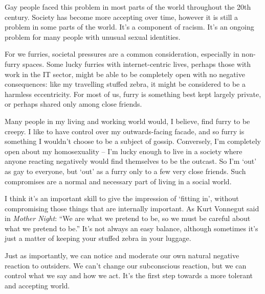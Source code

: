 Gay people faced this problem in most parts of the world throughout the 20th century. Society has become more accepting over time, however it is still a problem in some parts of the world. It's a component of racism. It's an ongoing problem for many people with unusual sexual identities.

For we furries, societal pressures are a common consideration, especially in non-furry spaces. Some lucky furries with internet-centric lives, perhaps those with work in the IT sector, might be able to be completely open with no negative consequences: like my travelling stuffed zebra, it might be considered to be a harmless eccentricity. For most of us, furry is something best kept largely private, or perhaps shared only among close friends.

Many people in my living and working world would, I believe, find furry to be creepy. I like to have control over my outwards-facing facade, and so furry is something I wouldn't choose to be a subject of gossip. Conversely, I'm completely open about my homosexuality -- I'm lucky enough to live in a society where anyone reacting negatively would find themselves to be the outcast. So I'm `out' as gay to everyone, but `out' as a furry only to a few very close friends. Such compromises are a normal and necessary part of living in a social world.

I think it's an important skill to give the impression of `fitting in', without compromising those things that are internally important. As Kurt Vonnegut said in \textit{Mother Night}: ``We are what we pretend to be, so we must be careful about what we pretend to be.'' It's not always an easy balance, although sometimes it's just a matter of keeping your stuffed zebra in your luggage.

Just as importantly, we can notice and moderate our own natural negative reaction to outsiders. We can't change our subconscious reaction, but we can control what we say and how we act. It's the first step towards a more tolerant and accepting world.
